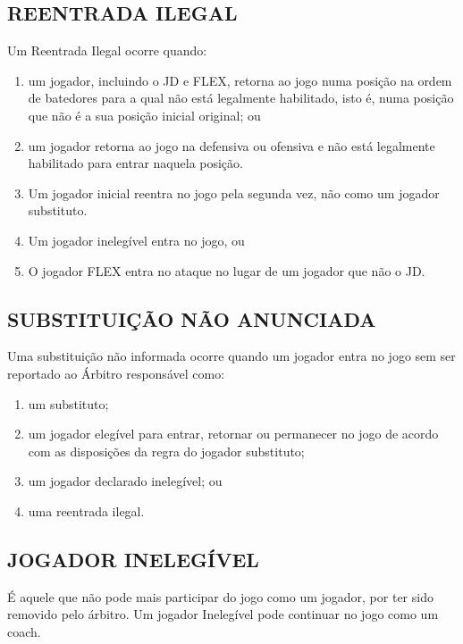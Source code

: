 \subsection{REENTRADA ILEGAL}
Um Reentrada Ilegal ocorre quando:

\begin{enumerate}[label=(\alph*)]\item   um jogador, incluindo o JD e FLEX, retorna ao jogo numa posição na ordem de batedores para a qual não está legalmente habilitado, isto é, numa posição que não é a sua posição inicial original; ou
	\item  um jogador retorna ao jogo na defensiva ou ofensiva e não está legalmente habilitado para entrar naquela posição.
	\item  Um jogador inicial reentra no jogo pela segunda vez, não como um jogador substituto.
	\item  Um jogador inelegível entra no jogo, ou
	\item  O jogador FLEX entra no ataque no lugar de um jogador que não o JD.
\end{enumerate}

\subsection{SUBSTITUIÇÃO NÃO ANUNCIADA}
\begin{mdframed}[hidealllines=true,backgroundcolor=blue!20]
	Uma substituição não informada ocorre quando um jogador entra no jogo sem ser reportado ao Árbitro responsável como:
	\begin{enumerate}[label=(\alph*)]\item   um substituto;
		\item  um jogador elegível para entrar, retornar ou permanecer no jogo de
		acordo com as disposições da regra do jogador substituto;
		\item  um jogador declarado inelegível; ou
		\item  uma reentrada ilegal.
	\end{enumerate}
\end{mdframed}

\subsection{JOGADOR INELEGÍVEL}
É aquele que não pode mais participar do jogo como um jogador, por ter sido removido pelo árbitro. Um jogador Inelegível pode continuar no jogo como um \gls{coach}.

